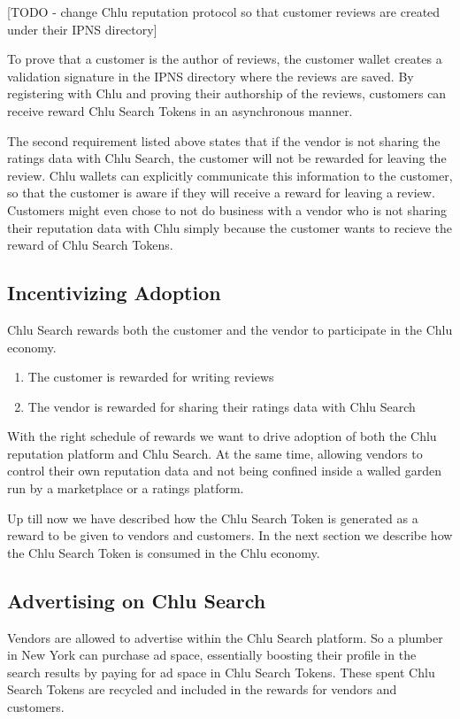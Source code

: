 \documentclass[a4paper]{article}
\begin{document}
[TODO - change Chlu reputation protocol so that customer reviews are
  created under their IPNS directory]

To prove that a customer is the author of reviews, the customer wallet
creates a validation signature in the IPNS directory where the reviews
are saved. By registering with Chlu and proving their authorship of
the reviews, customers can receive reward Chlu Search Tokens in an
asynchronous manner.

The second requirement listed above states that if the vendor is not
sharing the ratings data with Chlu Search, the customer will not be
rewarded for leaving the review. Chlu wallets can explicitly
communicate this information to the customer, so that the customer is
aware if they will receive a reward for leaving a review. Customers
might even chose to not do business with a vendor who is not sharing
their reputation data with Chlu simply because the customer wants to
recieve the reward of Chlu Search Tokens.

\subsection{Incentivizing Adoption}

Chlu Search rewards both the customer and the vendor to participate in
the Chlu economy.

\begin{enumerate}
\item The customer is rewarded for writing reviews
\item The vendor is rewarded for sharing their ratings data with Chlu
  Search
\end{enumerate}

With the right schedule of rewards we want to drive adoption of both
the Chlu reputation platform and Chlu Search. At the same time,
allowing vendors to control their own reputation data and not being
confined inside a walled garden run by a marketplace or a ratings
platform.

Up till now we have described how the Chlu Search Token is generated
as a reward to be given to vendors and customers. In the next section
we describe how the Chlu Search Token is consumed in the Chlu economy.

\subsection{Advertising on Chlu Search}

Vendors are allowed to advertise within the Chlu Search platform. So a
plumber in New York can purchase ad space, essentially boosting their
profile in the search results by paying for ad space in Chlu Search
Tokens. These spent Chlu Search Tokens are recycled and included in
the rewards for vendors and customers.
\end{document}
